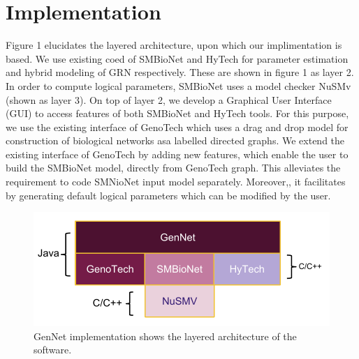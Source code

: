 \documentclass[twocolumn]{bmcart}%
\begin{document}
\section*{Implementation}
Figure 1 elucidates the layered architecture, upon which our implimentation is based. We use existing coed of SMBioNet and HyTech for parameter estimation and hybrid modeling of GRN respectively. These are shown in figure 1 as layer 2. In order to compute logical parameters, SMBioNet uses a model checker  NuSMv (shown as layer 3). On top of layer 2, we develop a Graphical User Interface (GUI) to access features of both SMBioNet and HyTech tools. For this purpose, we use the existing interface of GenoTech which uses a drag and drop model for construction of biological networks asa labelled directed graphs. We extend the existing interface of GenoTech by adding new features, which enable the user to build the SMBioNet model, directly from GenoTech graph. This alleviates the requirement to code SMNioNet input model separately. Moreover,, it facilitates by generating default logical parameters which can be modified by the user.
\begin{figure}[h!] 
  \includegraphics[scale=.55]{figures/Implementation.pdf}
  \caption{
      GenNet implementation shows the layered architecture of the software.}
   
      \end{figure}
\end{document}
